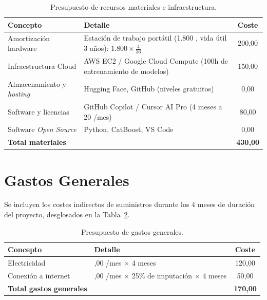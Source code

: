 \begin{table}[htbp]
\centering
\small
\begin{tabular}{@{}>{\raggedright\arraybackslash}p{}>{\raggedright\arraybackslash}p{}c@{}}
\toprule
\textbf{Concepto} & \textbf{Detalle} & \textbf{Coste} \\
\midrule
Amortización hardware & Estación de trabajo portátil (1.800 \texteuro{}, vida útil 3 años): $1.800 \times \frac{4}{36}$ & 200,00 \texteuro{} \\
Infraestructura Cloud & AWS EC2 / Google Cloud Compute (100h de entrenamiento de modelos) & 150,00 \texteuro{} \\
Almacenamiento y \textit{hosting} & Hugging Face, GitHub (niveles gratuitos) & 0,00 \texteuro{} \\
Software y licencias & GitHub Copilot / Cursor AI Pro (4 meses a 20 \texteuro{}/mes) & 80,00 \texteuro{} \\
Software \textit{Open Source} & Python, CatBoost, VS Code & 0,00 \texteuro{} \\
\midrule
\textbf{Total materiales} & & \textbf{430,00 \texteuro{}} \\
\bottomrule
\end{tabular}
\caption{Presupuesto de recursos materiales e infraestructura.}
\label{tab:presupuesto_materiales}
\end{table}

\section{Gastos Generales}

Se incluyen los costes indirectos de suministros durante los 4 meses de duración del proyecto, desglosados en la Tabla~\ref{tab:presupuesto_generales}.

\begin{table}[htbp]
\centering
\small
\begin{tabular}{@{}>{\raggedright\arraybackslash}p{}>{\raggedright\arraybackslash}p{}c@{}}
\toprule
\textbf{Concepto} & \textbf{Detalle} & \textbf{Coste} \\
\midrule
Electricidad & 30,00 \texteuro{}/mes $\times$ 4 meses & 120,00 \texteuro{} \\
Conexión a internet & 50,00 \texteuro{}/mes $\times$ 25\% de imputación $\times$ 4 meses & 50,00 \texteuro{} \\
\midrule
\textbf{Total gastos generales} & & \textbf{170,00 \texteuro{}} \\
\bottomrule
\end{tabular}
\caption{Presupuesto de gastos generales.}
\label{tab:presupuesto_generales}
\end{table}

